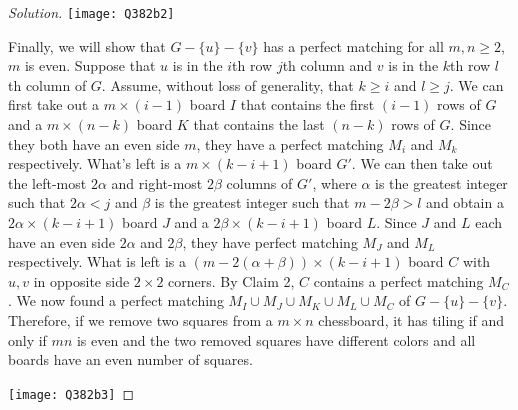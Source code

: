 \documentclass{article}
\begin{document}
\begin{enumerate}[label=(\alph*)]
\begin{proof}[Solution]
        \texttt{[image: Q382b2]}

        Finally, we will show that $G - \{u\} - \{v\}$ has a perfect matching for all $m, n \geq 2$, $m$ is even. Suppose that $u$ is in the $i$th row $j$th column and $v$ is in the $k$th row $l$th column of $G$. Assume, without loss of generality, that $k \geq i$ and $l \geq j$. We can first take out a $m \times (i - 1)$ board $I$ that contains the first $(i - 1)$ rows of $G$ and a $m \times (n - k)$ board $K$ that contains the last $(n - k)$ rows of $G$. Since they both have an even side $m$, they have a perfect matching $M_i$ and $M_k$ respectively. What's left is a $m \times (k - i + 1)$ board $G'$. We can then take out the left-most $2\alpha$ and right-most $2\beta$ columns of $G'$, where $\alpha$ is the greatest integer such that $2\alpha < j$ and $\beta$ is the greatest integer such that $m - 2\beta > l$ and obtain a $2\alpha \times (k - i + 1)$ board $J$ and a $2\beta \times (k - i + 1)$ board $L$. Since $J$ and $L$ each have an even side $2\alpha$ and $2\beta$, they have perfect matching $M_J$ and $M_L$ respectively. What is left is a $(m - 2(\alpha + \beta)) \times (k - i + 1)$ board $C$ with $u, v$ in opposite side $2 \times 2$ corners. By Claim 2, $C$ contains a perfect matching $M_C$. We now found a perfect matching $M_I \cup M_J \cup M_K \cup M_L \cup M_C$ of $G - \{u\} - \{v\}$. Therefore, if we remove two squares from a $m \times n$ chessboard, it has tiling if and only if $mn$ is even and the two removed squares have different colors and all boards have an even number of squares.
        
        \texttt{[image: Q382b3]}
    \end{proof}
\end{enumerate}

\newpage
\end{document}
